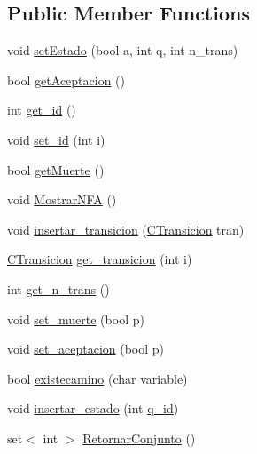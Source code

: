 \subsection*{Public Member Functions}
\begin{DoxyCompactItemize}
\item 
void \hyperlink{classCEstado_a205d938c7acd14b0ec86314162c8813f}{set\+Estado} (bool a, int q, int n\+\_\+trans)
\item 
bool \hyperlink{classCEstado_af1d8101863c51f8d3fca99fc1cd1c883}{get\+Aceptacion} ()
\item 
int \hyperlink{classCEstado_a8578682119ea4b96dbda46cf01db1b28}{get\+\_\+id} ()
\item 
void \hyperlink{classCEstado_a49cb79111fb7daa925857e8e38ca8c6b}{set\+\_\+id} (int i)
\item 
bool \hyperlink{classCEstado_aeb0a7a2c71a2c26471ddbc851c907f50}{get\+Muerte} ()
\item 
void \hyperlink{classCEstado_a010660248a8521d9df60d6e1d81ab92b}{Mostrar\+N\+FA} ()
\item 
void \hyperlink{classCEstado_ad08f6f204f257fb7e12436bbcc40b0f4}{insertar\+\_\+transicion} (\hyperlink{classCTransicion}{C\+Transicion} tran)
\item 
\hyperlink{classCTransicion}{C\+Transicion} \hyperlink{classCEstado_a307188d33798e78407233d65860f852d}{get\+\_\+transicion} (int i)
\item 
int \hyperlink{classCEstado_a412cdf24853e656329b64ef239e1ba2e}{get\+\_\+n\+\_\+trans} ()
\item 
void \hyperlink{classCEstado_adf87b55f9d93e237e768345ac34ba62d}{set\+\_\+muerte} (bool p)
\item 
void \hyperlink{classCEstado_aa7759717e41bb25d7ee5c5fff99dde87}{set\+\_\+aceptacion} (bool p)
\item 
bool \hyperlink{classCEstado_ace37ed71a9ddc500a3ce577b9f19ee85}{existecamino} (char variable)
\item 
void \hyperlink{classCEstado_a9b47f1bd5bb83afc3902c888aa4d346d}{insertar\+\_\+estado} (int \hyperlink{classCEstado_a2ff2cdec56804f70b389076be4501b4c}{q\+\_\+id})
\item 
set$<$ int $>$ \hyperlink{classCEstado_aa2f32f993b57466e5ba33bc82e52b60d}{Retornar\+Conjunto} ()
\end{DoxyCompactItemize}
